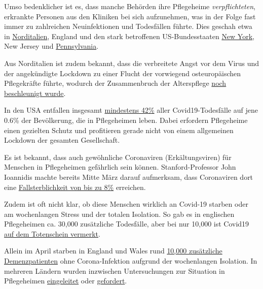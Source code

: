 Umso bedenklicher ist es, dass manche Behörden ihre Pflegeheime
\emph{verpflichteten}, erkrankte Personen aus den Kliniken bei sich
aufzunehmen, was in der Folge fast immer zu zahlreichen Neuinfektionen
und Todesfällen führte. Dies geschah etwa in
\href{https://www.trtworld.com/magazine/the-massacre-of-italy-s-elderly-nursing-home-residents-35575}{Norditalien},
England und den stark betroffenen US-Bundesstaaten
\href{https://nypost.com/2020/05/12/calls-for-independent-probe-of-gov-cuomos-nursing-home-policies/}{New
York}, New Jersey und
\href{https://nypost.com/2020/05/13/pennsylvania-health-official-moved-mother-from-nursing-home/}{Pennsylvania}.

Aus Norditalien ist zudem bekannt, dass die verbreitete Angst vor dem
Virus und der angekündigte Lockdown zu einer Flucht der vorwiegend
osteuropäischen Pflegekräfte führte, wodurch der Zusammenbruch der
Alterspflege \href{https://swprs.org/covid-19-a-report-from-italy/}{noch
beschleunigt wurde}.

In den USA entfallen insgesamt
\href{https://www.forbes.com/sites/theapothecary/2020/05/26/nursing-homes-assisted-living-facilities-0-6-of-the-u-s-population-43-of-u-s-covid-19-deaths/\#70834ed374cd}{mindestens
42\%} aller Covid19-Todesfälle auf jene 0.6\% der Bevölkerung, die in
Pflegeheimen leben. Dabei erfordern Pflegeheime einen gezielten Schutz
und profitieren gerade nicht von einem allgemeinen Lockdown der gesamten
Gesellschaft.

Es ist bekannt, dass auch gewöhnliche Coronaviren (Erkältungsviren) für
Menschen in Pflegeheimen gefährlich sein können. Stanford-Professor John
Ioannidis machte bereits Mitte März darauf aufmerksam, dass Coronaviren
dort eine
\href{https://www.statnews.com/2020/03/17/a-fiasco-in-the-making-as-the-coronavirus-pandemic-takes-hold-we-are-making-decisions-without-reliable-data/}{Fallsterblichkeit
von bis zu 8\%} erreichen.

Zudem ist oft nicht klar, ob diese Menschen wirklich an Covid-19 starben
oder am wochenlangen Stress und der totalen Isolation. So gab es in
englischen Pflegeheimen ca. 30,000 zusätzliche Todesfälle, aber bei nur
10,000 ist Covid19 \href{https://www.bmj.com/content/369/bmj.m1931}{auf
dem Totenschein vermerkt}.

Allein im April starben in England und Wales rund
\href{https://www.theguardian.com/world/2020/jun/05/covid-19-causing-10000-dementia-deaths-beyond-infections-research-says}{10,000
zusätzliche Demenzpatienten} ohne Corona-Infektion aufgrund der
wochenlangen Isolation. In mehreren Ländern wurden inzwischen
Untersuchungen zur Situation in Pflegeheimen
\href{https://www.theguardian.com/world/2020/apr/16/italian-police-broaden-care-home-coronavirus-milan}{eingeleitet}
oder
\href{https://nypost.com/2020/05/12/calls-for-independent-probe-of-gov-cuomos-nursing-home-policies/}{gefordert}.


